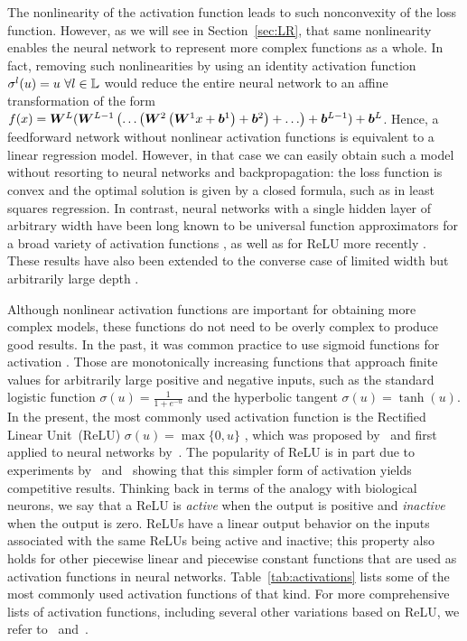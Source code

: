 The nonlinearity of the activation function leads to such nonconvexity of the loss function. 
However, as we will see in Section~\ref{sec:LR}, that same nonlinearity enables the neural network to represent more complex functions as a whole. 
In fact, removing such nonlinearities by using an identity activation function $\sigma^l(u) = u ~ \forall l \in {\mathbb{L}}$ would reduce the entire neural network to an affine transformation of the form $f(x) = {\bm{W}}^{L} ( {\bm{W}}^{L-1} \left( \ldots \left( {\bm{W}}^2 \left( {\bm{W}}^1 x + {\bm{b}}^1 \right) + {\bm{b}}^2 \right) + \ldots \right) + {\bm{b}}^{L-1} ) + {\bm{b}}^{L}$. 
Hence, a feedforward network without nonlinear activation functions is equivalent to a linear regression model. 
However, in that case we can easily obtain such a model without resorting to neural networks and backpropagation: the loss function is convex and the optimal solution is given by a closed formula, such as in least squares regression.  
In contrast, 
neural networks with a single hidden layer of arbitrary width have been long known to be universal function approximators for a broad variety of activation functions \citep{Cybenko1989,funahashi1989approximate,Hornik1989}, as well as for ReLU more recently \citep{yarotsky2017relu}. 
These results have also been extended to the converse case of limited width but arbitrarily large depth \citep{lu2017expressive,hanin2017approximating,park2021width}. 

Although nonlinear activation functions are important for obtaining more complex models, these functions do not need to be overly complex to produce good results. 
In the past, it was common practice to use sigmoid functions for activation \citep{TricksBP}. Those are monotonically increasing functions that approach finite values for arbitrarily large positive and negative inputs, 
such as the standard logistic function $\sigma(u) = \frac{1}{1+e^{-u}}$ and the hyperbolic tangent $\sigma(u) = \tanh(u)$. 
In the present, the most commonly used activation function is the Rectified Linear Unit~(ReLU) $\sigma(u) = \max\{0,u\}$ \citep{CurrentDNN,ReluPop2018}, which was proposed by~\cite{OriginReLU} and first applied to neural networks by~\cite{nair2010rectified}. 
The popularity of ReLU is in part due to experiments by~\cite{nair2010rectified} and~\cite{ReLUGood2} showing that this simpler form of activation yields competitive results. 
Thinking back in terms of the analogy with biological neurons, 
we say that a ReLU is \emph{active} when the output is positive and \emph{inactive} when the output is zero. 
ReLUs have a linear output behavior on the inputs associated with the same ReLUs being active and inactive; this property also holds for other piecewise linear and piecewise constant functions that are used as activation functions in neural networks. 
Table~\ref{tab:activations} lists some of the most commonly used activation functions of that kind. For more comprehensive lists of activation functions, including several other variations based on ReLU, we refer to~\cite{dubey2021activations} and~\cite{tao2022piecewise}.


